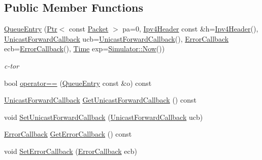 \subsection*{Public Member Functions}
\begin{DoxyCompactItemize}
\item 
\hyperlink{classns3_1_1aodv_1_1QueueEntry_a7b77ca110998dba604d8deb819798a6d}{Queue\+Entry} (\hyperlink{classns3_1_1Ptr}{Ptr}$<$ const \hyperlink{classns3_1_1Packet}{Packet} $>$ pa=0, \hyperlink{classns3_1_1Ipv4Header}{Ipv4\+Header} const \&h=\hyperlink{classns3_1_1Ipv4Header}{Ipv4\+Header}(), \hyperlink{classns3_1_1aodv_1_1QueueEntry_ac0f936aaa2d2de7ba253755b56cecc65}{Unicast\+Forward\+Callback} ucb=\hyperlink{classns3_1_1aodv_1_1QueueEntry_ac0f936aaa2d2de7ba253755b56cecc65}{Unicast\+Forward\+Callback}(), \hyperlink{classns3_1_1aodv_1_1QueueEntry_a0a8a6e41579672fb47dc7c9c7cbaf528}{Error\+Callback} ecb=\hyperlink{classns3_1_1aodv_1_1QueueEntry_a0a8a6e41579672fb47dc7c9c7cbaf528}{Error\+Callback}(), \hyperlink{classns3_1_1Time}{Time} exp=\hyperlink{classns3_1_1Simulator_ac3178fa975b419f7875e7105be122800}{Simulator\+::\+Now}())
\begin{DoxyCompactList}\small\item\em c-\/tor \end{DoxyCompactList}\item 
bool \hyperlink{classns3_1_1aodv_1_1QueueEntry_a098fc490e753559291f487b13611070f}{operator==} (\hyperlink{classns3_1_1aodv_1_1QueueEntry}{Queue\+Entry} const \&o) const 
\item 
\hyperlink{classns3_1_1aodv_1_1QueueEntry_ac0f936aaa2d2de7ba253755b56cecc65}{Unicast\+Forward\+Callback} \hyperlink{classns3_1_1aodv_1_1QueueEntry_acacfd61b8479ac5e0c7794de608ce2b5}{Get\+Unicast\+Forward\+Callback} () const 
\item 
void \hyperlink{classns3_1_1aodv_1_1QueueEntry_a9c3a651fe5dbd695c9f88b0bc7718a57}{Set\+Unicast\+Forward\+Callback} (\hyperlink{classns3_1_1aodv_1_1QueueEntry_ac0f936aaa2d2de7ba253755b56cecc65}{Unicast\+Forward\+Callback} ucb)
\item 
\hyperlink{classns3_1_1aodv_1_1QueueEntry_a0a8a6e41579672fb47dc7c9c7cbaf528}{Error\+Callback} \hyperlink{classns3_1_1aodv_1_1QueueEntry_a2ec684a0c90d33969d549a52cd434e59}{Get\+Error\+Callback} () const 
\item 
void \hyperlink{classns3_1_1aodv_1_1QueueEntry_a17329df86783760987082e60d662f335}{Set\+Error\+Callback} (\hyperlink{classns3_1_1aodv_1_1QueueEntry_a0a8a6e41579672fb47dc7c9c7cbaf528}{Error\+Callback} ecb)
\item 

\end{DoxyCompactItemize}
